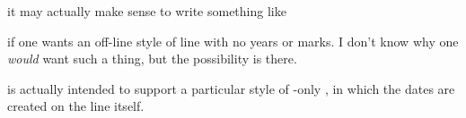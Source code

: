 \documentclass[10pt,british,a4paper]{ltxdoc}
\begin{document}
it may actually make sense to write something like
\begin{chronoscode}
  \begin{chronos}
    [
      timeline={%
        timeline years=off line,
        timeline years=none,
      },
    ]
  \end{chronos}
\end{chronoscode}
if one wants an off-line style of line with no years or marks.
I don't know why one \emph{would} want such a thing, but the possibility is there.

 is actually intended to support a particular style of -only , in which the dates are created on the line itself.
\end{document}
